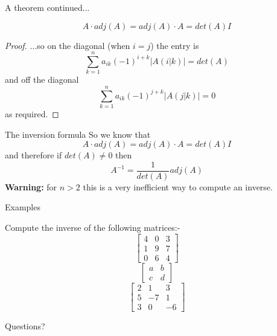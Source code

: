 \documentclass{beamer}
\begin{document}
\begin{frame}{A theorem continued...}
  \begin{theorem}
    \begin{equation*}
      A\cdot adj(A) = adj(A)\cdot A = det(A) I
    \end{equation*}
    \begin{proof}
      ...so on the diagonal (when $i=j$) the entry is
      \begin{equation*}
        \sum_{k=1}^n a_{ik}(-1)^{i+k}\left|A(i|k)\right| = det(A)
      \end{equation*}
      and off the diagonal
      \begin{equation*}
        \sum_{k=1}^n a_{ik}(-1)^{j+k}\left|A(j|k)\right| = 0
      \end{equation*}
      as required.
    \end{proof}
  \end{theorem}
\end{frame}

\begin{frame}{The inversion formula}
  So we know that
  \begin{equation*}
    A\cdot adj(A) = adj(A)\cdot A = det(A) I
  \end{equation*}\vfill
  and therefore if $det(A)\neq 0$ then
  \begin{equation*}
    A^{-1} = \frac{1}{det(A)} adj(A)
  \end{equation*}\vfill
  {\bf Warning:} for $n>2$ this is a very inefficient way to compute an inverse.
\end{frame}

\begin{frame}{Examples}
  \begin{example}
    Compute the inverse of the following matrices:-
    \begin{equation*}
      \left[
	\begin{array}{ccc}
          4&0&3\\
          1&9&7\\
          0&6&4
	\end{array}
      \right]
    \end{equation*}
    \begin{equation*}
      \left[
	\begin{array}{cc}
          a&b\\
          c&d
	\end{array}
      \right]
    \end{equation*}
    \begin{equation*}
      \left[
	\begin{array}{ccc}
          2&1&3\\
          5&-7&1\\
          3&0&-6
	\end{array}
      \right]
    \end{equation*}
  \end{example}
\end{frame}

\begin{frame}
  Questions?
\end{frame}
\end{document}
